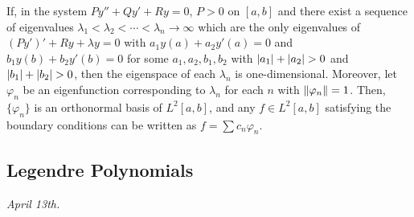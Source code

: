 \begin{theorem}
    If, in the system $Py'' + Qy' + Ry = 0$, $P > 0$ on $[a,b]$ and there exist a sequence of eigenvalues $\lambda_{1} < \lambda_{2} < \cdots < \lambda_{n} \to \infty$ which are the only eigenvalues of $(Py')' + Ry + \lambda y = 0$ with $a_{1} y(a) + a_{2} y'(a) = 0$ and $b_{1} y(b) + b_{2} y'(b) = 0$ for some $a_{1},a_{2},b_{1},b_{2}$ with $\left| a_{1} \right| + \left| a_{2} \right| > 0$ and $\left| b_{1} \right| + \left| b_{2} \right| > 0$, then the eigenspace of each $\lambda_{n}$ is one-dimensional. Moreover, let $\varphi_{n}$ be an eigenfunction corresponding to $\lambda_{n}$ for each $n$ with $\left\lVert\varphi_{n}\right\rVert = 1$. Then, $\{\varphi_{n}\}$ is an orthonormal basis of $L^{2}[a,b]$, and any $f \in L^{2}[a,b]$ satisfying the boundary conditions can be written as $f = \sum c_{n} \varphi_{n}$.
\end{theorem}


\subsection{Legendre Polynomials}
\noindent \textit{April 13th.}

